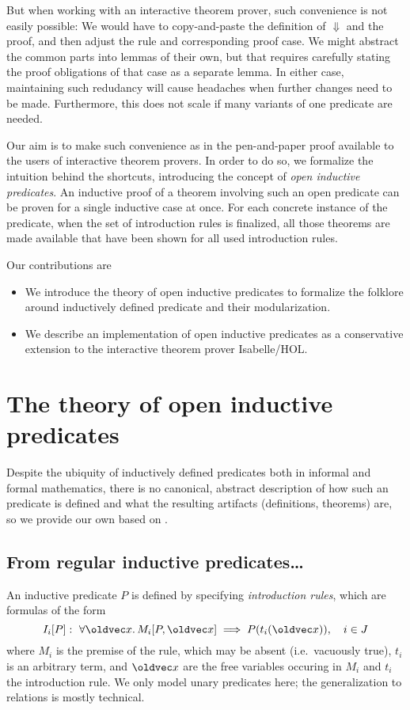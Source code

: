 \documentclass{llncs}
\let\vec\oldvec%
\newcommand{\sRule}[1]{\text{{\textsc{#1}}}}
\begin{document}
But when working with an interactive theorem prover, such convenience is not easily possible: We would have to copy-and-paste the definition of $\Downarrow$ and the proof, and then adjust the rule \sRule{Var} and corresponding proof case. We might abstract the common parts into lemmas of their own, but that requires carefully stating the proof obligations of that case as a separate lemma. In either case, maintaining such redudancy will cause headaches when further changes need to be made. Furthermore, this does not scale if many variants of one predicate are needed.

Our aim is to make such convenience as in the pen-and-paper proof available to the users of interactive theorem provers. In order to do so, we formalize the intuition behind the shortcuts, introducing the concept of \emph{open inductive predicates}. An inductive proof of a theorem involving such an open predicate can be proven for a single inductive case at once. For each concrete instance of the predicate, when the set of introduction rules is finalized, all those theorems are made available that have been shown for all used introduction rules.

\noindent Our contributions are
\begin{itemize}
\item We introduce the theory of open inductive predicates to formalize the folklore around inductively defined predicate and their modularization.
\item We describe an implementation of open inductive predicates as a conservative extension to the interactive theorem prover Isabelle/HOL.
\end{itemize}

\section{The theory of open inductive predicates}

Despite the ubiquity of inductively defined predicates both in informal and formal mathematics, there is no canonical, abstract description of how such an predicate is defined and what the resulting artifacts (definitions, theorems) are, so we provide our own based on \cite{paulson-2000}.

\subsection{From regular inductive predicates\ldots}

An inductive predicate $P$ is defined by specifying \emph{introduction rules}, which are formulas of the form
\[
I_i[P]:\ \forall \vec x.\,   M_i[P, \vec x] \implies P(t_i(\vec x)), \quad i \in J
\]
where $M_i$ is the premise of the rule, which may be absent (i.e.\ vacuously true), $t_i$ is an arbitrary term, and $\vec x$ are the free variables occuring in $M_i$ and $t_i$ the introduction rule. We only model unary predicates here; the generalization to relations is mostly technical.
\end{document}
